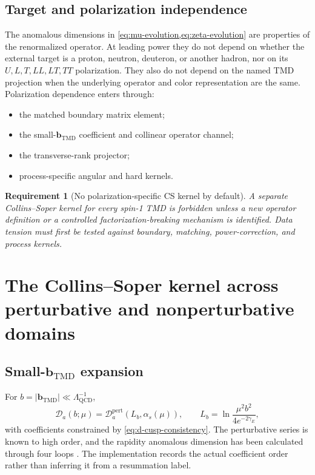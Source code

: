 \documentclass[11pt]{article}
\newtheorem{requirement}[definition]{Requirement}
\newcommand{\bM}{\bm{b}_{\mathrm{TMD}}}
\newcommand{\QCD}{\mathrm{QCD}}
\newcommand{\cD}{\mathcal D}
\newcommand{\abs}[1]{\left|#1\right|}
\newcommand{\pert}{\mathrm{pert}}
\begin{document}
\subsection{Target and polarization independence}

The anomalous dimensions in
\cref{eq:mu-evolution,eq:zeta-evolution} are properties of the renormalized
operator.  At leading power they do not depend on whether the external target
is a proton, neutron, deuteron, or another hadron, nor on its
\(U,L,T,LL,LT,TT\) polarization.  They also do not depend on the named TMD
projection when the underlying operator and color representation are the
same.  Polarization dependence enters through:
\begin{itemize}
\item the matched boundary matrix element;
\item the small-\(\bM\) coefficient and collinear operator channel;
\item the transverse-rank projector;
\item process-specific angular and hard kernels.
\end{itemize}

\begin{requirement}[No polarization-specific CS kernel by default]
A separate Collins--Soper kernel for every spin-1 TMD is forbidden unless a
new operator definition or a controlled factorization-breaking mechanism is
identified.  Data tension must first be tested against boundary, matching,
power-correction, and process kernels.
\end{requirement}

\section{The Collins--Soper kernel across perturbative and nonperturbative domains}
\label{sec:cs-kernel}

\subsection{Small-\texorpdfstring{\(\bM\)}{bTMD} expansion}

For \(b=\abs{\bM}\ll\Lambda_{\QCD}^{-1}\),
\begin{equation}
 \cD_a(b;\mu)
 =\cD_a^{\pert}
 \left(L_b,\alpha_s(\mu)\right),
 \qquad
 L_b=\ln\frac{\mu^2b^2}{4e^{-2\gamma_E}},
 \label{eq:perturbative-d-kernel}
\end{equation}
with coefficients constrained by
\cref{eq:d-cusp-consistency}.  The perturbative series is known to high order,
and the rapidity anomalous dimension has been calculated through four loops
\cite{MoultZhuZhu2022,DuhrMistlbergerVita2022}.  The implementation records the
actual coefficient order rather than inferring it from a resummation label.
\end{document}

